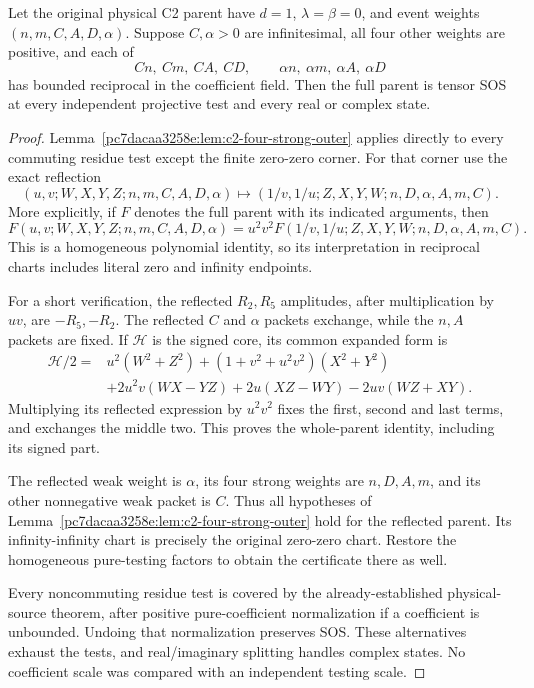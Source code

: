 \begin{theorem}
\label{p8b53b68d8af6:thm:c2-matching-strength}
Let the original physical C2 parent have $d=1$, $\lambda=\beta=0$,
and event weights $(n,m,C,A,D,\alpha)$.  Suppose $C,\alpha>0$ are
infinitesimal, all four other weights are positive, and each of
\[
 Cn,\ Cm,\ CA,\ CD,\qquad
 \alpha n,\ \alpha m,\ \alpha A,\ \alpha D
\]
has bounded reciprocal in the coefficient field.  Then the full parent
is tensor SOS at every independent projective test and every real or
complex state.
\end{theorem}
\begin{proof}
Lemma~\ref{pc7dacaa3258e:lem:c2-four-strong-outer} applies directly to every commuting
residue test except the finite zero-zero corner.
For that corner use the exact reflection
\begin{equation}
 (u,v;W,X,Y,Z;n,m,C,A,D,\alpha)
 \longmapsto
 (1/v,1/u;Z,X,Y,W;n,D,\alpha,A,m,C).
\label{p8b53b68d8af6:eq:c2ms-reflection}
\end{equation}
More explicitly, if $F$ denotes the full parent with its indicated
arguments, then
\begin{equation}
 F(u,v;W,X,Y,Z;n,m,C,A,D,\alpha)
 =u^2v^2F(1/v,1/u;Z,X,Y,W;n,D,\alpha,A,m,C).
\label{p8b53b68d8af6:eq:c2ms-reflection-identity}
\end{equation}
This is a homogeneous polynomial identity, so its interpretation in
reciprocal charts includes literal zero and infinity endpoints.

For a short verification, the reflected $R_2,R_5$ amplitudes, after
multiplication by $uv$, are $-R_5,-R_2$.  The reflected $C$ and
$\alpha$ packets exchange, while the $n,A$ packets are fixed.
If $\mathcal H$ is the signed core, its common expanded form is
\begin{align*}
 \mathcal H/2={}&u^2(W^2+Z^2)+(1+v^2+u^2v^2)(X^2+Y^2)\\
 &+2u^2v(WX-YZ)+2u(XZ-WY)-2uv(WZ+XY).
\end{align*}
Multiplying its reflected expression by $u^2v^2$ fixes the first,
second and last terms, and exchanges the middle two.  This proves the
whole-parent identity, including its signed part.

The reflected weak weight is $\alpha$, its four strong weights are
$n,D,A,m$, and its other nonnegative weak packet is $C$.
Thus all hypotheses of Lemma~\ref{pc7dacaa3258e:lem:c2-four-strong-outer} hold for
the reflected parent.  Its infinity-infinity chart is precisely the
original zero-zero chart.  Restore the homogeneous pure-testing
factors to obtain the certificate there as well.

Every noncommuting residue test is covered by the already-established
physical-source theorem, after positive pure-coefficient normalization
if a coefficient is unbounded.  Undoing that normalization preserves
SOS.  These alternatives exhaust the tests, and real/imaginary splitting
handles complex states.  No coefficient scale was compared with an
independent testing scale.
\end{proof}

